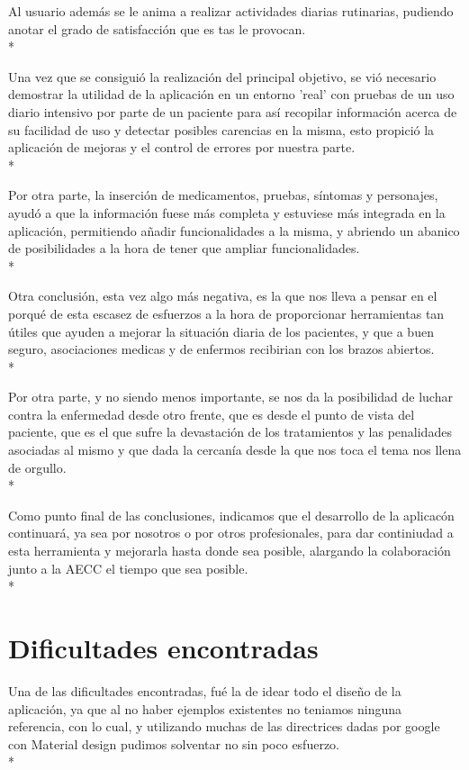 \documentclass[../pfc.tex]{subfiles}
\begin{document}
	Al usuario además se le anima a realizar actividades diarias rutinarias, pudiendo anotar el grado de satisfacción que es tas le provocan.\\*
	
	Una vez que se consiguió la realización del principal objetivo, se vió necesario demostrar la utilidad de la aplicación en un entorno 'real' con pruebas de un uso diario intensivo por parte de un paciente para así recopilar información acerca de su facilidad de uso y detectar posibles carencias en la misma, esto propició la aplicación de mejoras y el control de errores por nuestra parte.\\*
	
	Por otra parte, la inserción de medicamentos, pruebas, síntomas y personajes, ayudó a que la información fuese más completa y estuviese más integrada en la aplicación, permitiendo añadir funcionalidades a la misma, y abriendo un abanico de posibilidades a la hora de tener que ampliar funcionalidades.\\*
		
	
	Otra conclusión, esta vez algo más negativa, es la que nos lleva a pensar en el porqué de esta escasez de esfuerzos a la hora de proporcionar herramientas tan útiles que ayuden a mejorar la situación diaria de los pacientes, y que a buen seguro, asociaciones medicas y de enfermos recibirian con los brazos abiertos.\\*
	 
		
	Por otra parte, y no siendo menos importante, se nos da la posibilidad de luchar contra la enfermedad desde otro frente, que es desde el punto de vista del paciente, que es el que sufre la devastación de los tratamientos y las penalidades asociadas al mismo y que dada la cercanía desde la que nos toca el tema nos llena de orgullo.\\*
	
	Como punto final de las conclusiones, indicamos que el desarrollo de la aplicacón continuará, ya sea por nosotros o por otros profesionales, para dar continiudad a esta herramienta y mejorarla hasta donde sea posible, alargando la colaboración junto a la AECC el tiempo que sea posible.\\*
	
	

	\section{Dificultades encontradas}
	
	Una de las dificultades encontradas, fué la de idear todo el diseño de la aplicación, ya que al no haber ejemplos existentes no teniamos ninguna referencia, con lo cual, y utilizando muchas de las directrices dadas por google con Material design pudimos solventar no sin poco esfuerzo.\\*
		
\end{document}
